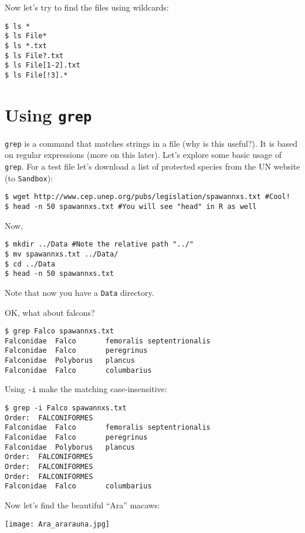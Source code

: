 Now let's try to find the files using wildcards:

\begin{lstlisting}
$ ls *
$ ls File*
$ ls *.txt
$ ls File?.txt
$ ls File[1-2].txt
$ ls File[!3].*
\end{lstlisting}

\section{Using {\tt grep}}

{\tt grep} is a command that matches strings in a file (why is this 
useful?). It is based on regular expressions (more on this later). 
Let's explore some basic usage of {\tt grep}. For a test file let's 
download a list of protected species from the UN website (to 
{\tt Sandbox}):
 
\begin{lstlisting}
$ wget http://www.cep.unep.org/pubs/legislation/spawannxs.txt #Cool!
$ head -n 50 spawannxs.txt #You will see "head" in R as well
\end{lstlisting}

Now,

\begin{lstlisting}
$ mkdir ../Data #Note the relative path "../"
$ mv spawannxs.txt ../Data/
$ cd ../Data
$ head -n 50 spawannxs.txt 
\end{lstlisting}

Note that now you have a {\tt Data} directory. 

OK, what about falcons? 
 
\begin{lstlisting}
$ grep Falco spawannxs.txt
Falconidae	Falco		femoralis septentrionalis
Falconidae	Falco		peregrinus
Falconidae	Polyborus	plancus
Falconidae	Falco		columbarius
\end{lstlisting}

Using {\tt -i} make the matching case-insensitive:
 
\begin{lstlisting}
$ grep -i Falco spawannxs.txt
Order:	FALCONIFORMES
Falconidae	Falco		femoralis septentrionalis
Falconidae	Falco		peregrinus
Falconidae	Polyborus	plancus
Order:	FALCONIFORMES
Order:	FALCONIFORMES
Order:	FALCONIFORMES
Falconidae	Falco		columbarius
\end{lstlisting}

Now let's find the beautiful ``Ara'' macaws:
\begin{center}
  \texttt{[image: Ara\_ararauna.jpg]}
\end{center}

